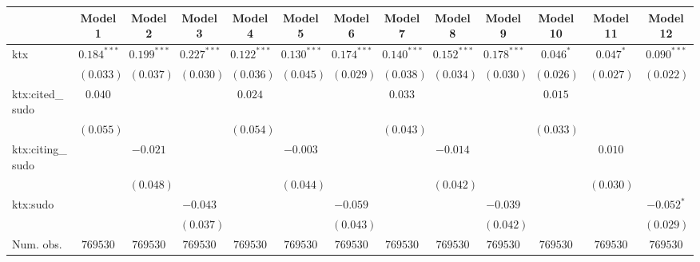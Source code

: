 
\begin{table}
\begin{center}
\begin{tabular}{l c c c c c c c c c c c c}
\hline
 & Model 1 & Model 2 & Model 3 & Model 4 & Model 5 & Model 6 & Model 7 & Model 8 & Model 9 & Model 10 & Model 11 & Model 12 \\
\hline
ktx                             & $0.184^{***}$ & $0.199^{***}$ & $0.227^{***}$ & $0.122^{***}$ & $0.130^{***}$ & $0.174^{***}$ & $0.140^{***}$ & $0.152^{***}$ & $0.178^{***}$ & $0.046^{*}$ & $0.047^{*}$ & $0.090^{***}$ \\
                                & $(0.033)$     & $(0.037)$     & $(0.030)$     & $(0.036)$     & $(0.045)$     & $(0.029)$     & $(0.038)$     & $(0.034)$     & $(0.030)$     & $(0.026)$   & $(0.027)$   & $(0.022)$     \\
ktx:cited\_sudo                 & $0.040$       &               &               & $0.024$       &               &               & $0.033$       &               &               & $0.015$     &             &               \\
                                & $(0.055)$     &               &               & $(0.054)$     &               &               & $(0.043)$     &               &               & $(0.033)$   &             &               \\
ktx:citing\_sudo                &               & $-0.021$      &               &               & $-0.003$      &               &               & $-0.014$      &               &             & $0.010$     &               \\
                                &               & $(0.048)$     &               &               & $(0.044)$     &               &               & $(0.042)$     &               &             & $(0.030)$   &               \\
ktx:sudo                        &               &               & $-0.043$      &               &               & $-0.059$      &               &               & $-0.039$      &             &             & $-0.052^{*}$  \\
                                &               &               & $(0.037)$     &               &               & $(0.043)$     &               &               & $(0.042)$     &             &             & $(0.029)$     \\
\hline
Num. obs.                       & $769530$      & $769530$      & $769530$      & $769530$      & $769530$      & $769530$      & $769530$      & $769530$      & $769530$      & $769530$    & $769530$    & $769530$      \\

\end{tabular}
\end{center}
\end{table}
